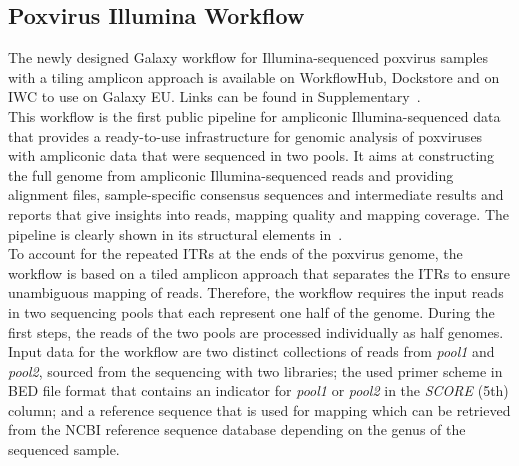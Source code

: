 \subsection{Poxvirus Illumina Workflow}\label{sec:pox-wf}
The newly designed Galaxy workflow for Illumina-sequenced poxvirus samples with a tiling amplicon approach is available on WorkflowHub, Dockstore and on \ac{IWC} to use on Galaxy EU. Links can be found in Supplementary~. \\
This workflow is the first public pipeline for ampliconic Illumina-sequenced data that provides a ready-to-use infrastructure for genomic analysis of poxviruses with ampliconic data that were sequenced in two pools. It aims at constructing the full genome from ampliconic Illumina-sequenced reads and providing alignment files, sample-specific consensus sequences and intermediate results and reports that give insights into reads, mapping quality and mapping coverage. The pipeline is clearly shown in its structural elements in~. \\ 
To account for the repeated \acp{ITR} at the ends of the poxvirus genome, the workflow is based on a tiled amplicon approach that separates the \acp{ITR} to ensure unambiguous mapping of reads. Therefore, the workflow requires the input reads in two sequencing pools that each represent one half of the genome. During the first steps, the reads of the two pools are processed individually as half genomes. Input data for the workflow are two distinct collections of reads from \textit{pool1} and \textit{pool2}, sourced from the sequencing with two libraries; the used primer scheme in \ac{BED} file format that contains an indicator for \textit{pool1} or \textit{pool2} in the \textit{SCORE} (5th) column; and a reference sequence that is used for mapping which can be retrieved from the \ac{NCBI} reference sequence database depending on the genus of the sequenced sample. 

